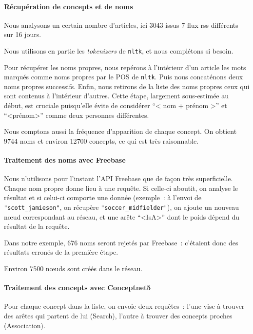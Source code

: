 \documentclass[a4paper, 12pt]{article}
\newcommand{\pyt}[1]{\texttt{#1}}%
\newcommand{\ang}[1]{\textit{#1}}%
\begin{document}
\paragraph{Récupération de concepts et de noms}

Nous analysons un certain nombre d'articles, ici 3043 issus 7 flux rss différents sur 16 jours.

Nous utilisons en partie les \ang{tokenizers} de \pyt{nltk}, et nous complétons si besoin.

Pour récupérer les noms propres, nous repérons à l'intérieur d'un article les mots marqués comme noms propres par le POS de \pyt{nltk}. Puis nous concaténons deux noms propres successifs. Enfin, nous retirons de la liste des noms propres ceux qui sont contenus à l'intérieur d'autres. Cette étape, largement sous-estimée au début, est cruciale puisqu'elle évite de considérer ``< nom + prénom >'' et ``<prénom>'' comme deux personnes différentes.

Nous comptons aussi la fréquence d'apparition de chaque concept. On obtient 9744 noms et environ 12700 concepts, ce qui est très raisonnable.

\paragraph{Traitement des noms avec Freebase}

Nous n'utilisons pour l'instant l'API Freebase que de fa\c{c}on très superficielle. Chaque nom propre donne lieu à une requête. Si celle-ci aboutit, on analyse le résultat et si celui-ci comporte une donnée (exemple~: à l'envoi de \verb|"scott_jamieson"|, on récupère \verb|"soccer_midfielder"|), on ajoute un nouveau nœud correspondant au réseau, et une arête ``<IsA>'' dont le poids dépend du résultat de la requête.

Dans notre exemple, 676 noms seront rejetés par Freebase~: c'étaient donc des résultats erronés de la première étape.

Environ 7500 nœuds sont créés dans le réseau.

\paragraph{Traitement des concepts avec Conceptnet5}

Pour chaque concept dans la liste, on envoie deux requêtes~: l'une vise à trouver des arêtes qui partent de lui (Search), l'autre à trouver des concepts proches (Association).
\end{document}
